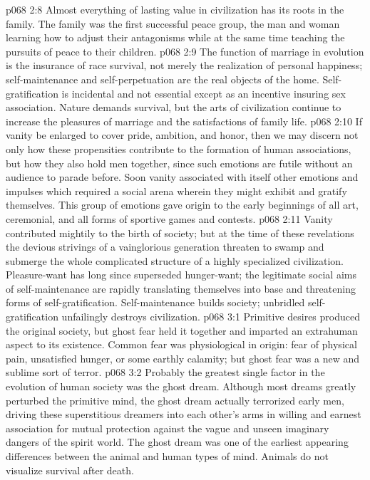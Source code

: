 \vs p068 2:8 Almost everything of lasting value in civilization has its roots in the family. The family was the first successful peace group, the man and woman learning how to adjust their antagonisms while at the same time teaching the pursuits of peace to their children.
\vs p068 2:9 The function of marriage in evolution is the insurance of race survival, not merely the realization of personal happiness; self\hyp{}maintenance and self\hyp{}perpetuation are the real objects of the home. Self\hyp{}gratification is incidental and not essential except as an incentive insuring sex association. Nature demands survival, but the arts of civilization continue to increase the pleasures of marriage and the satisfactions of family life.
\pc \vs p068 2:10 If vanity be enlarged to cover pride, ambition, and honor, then we may discern not only how these propensities contribute to the formation of human associations, but how they also hold men together, since such emotions are futile without an audience to parade before. Soon vanity associated with itself other emotions and impulses which required a social arena wherein they might exhibit and gratify themselves. This group of emotions gave origin to the early beginnings of all art, ceremonial, and all forms of sportive games and contests.
\vs p068 2:11 Vanity contributed mightily to the birth of society; but at the time of these revelations the devious strivings of a vainglorious generation threaten to swamp and submerge the whole complicated structure of a highly specialized civilization. Pleasure\hyp{}want has long since superseded hunger\hyp{}want; the legitimate social aims of self\hyp{}maintenance are rapidly translating themselves into base and threatening forms of self\hyp{}gratification. Self\hyp{}maintenance builds society; unbridled self\hyp{}gratification unfailingly destroys civilization.\plusone
{}
\vs p068 3:1 Primitive desires produced the original society, but ghost fear held it together and imparted an extrahuman aspect to its existence. Common fear was physiological in origin: fear of physical pain, unsatisfied hunger, or some earthly calamity; but ghost fear was a new and sublime sort of terror.
\vs p068 3:2 Probably the greatest single factor in the evolution of human society was the ghost dream. Although most dreams greatly perturbed the primitive mind, the ghost dream actually terrorized early men, driving these superstitious dreamers into each other’s arms in willing and earnest association for mutual protection against the vague and unseen imaginary dangers of the spirit world. The ghost dream was one of the earliest appearing differences between the animal and human types of mind. Animals do not visualize survival after death.
